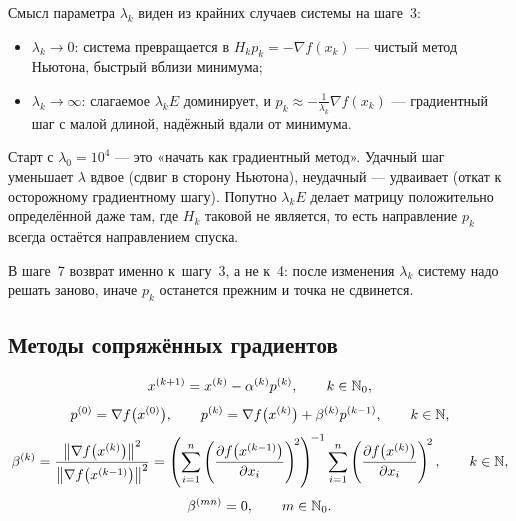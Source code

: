 \begin{idea}
Смысл параметра $\lambda_k$ виден из крайних случаев системы на шаге~3:
\begin{itemize}[nosep,left=0pt]
  \item $\lambda_k \to 0$: система превращается в $H_k p_k = -\nabla f(x_k)$ —
        чистый метод Ньютона, быстрый вблизи минимума;
  \item $\lambda_k \to \infty$: слагаемое $\lambda_k E$ доминирует, и
        $p_k \approx -\frac{1}{\lambda_k}\nabla f(x_k)$ — градиентный шаг с
        малой длиной, надёжный вдали от минимума.
\end{itemize}
Старт с $\lambda_0 = 10^4$ — это «начать как градиентный метод». Удачный шаг
уменьшает $\lambda$ вдвое (сдвиг в сторону Ньютона), неудачный — удваивает
(откат к осторожному градиентному шагу). Попутно $\lambda_k E$ делает матрицу
положительно определённой даже там, где $H_k$ таковой не является, то есть
направление $p_k$ всегда остаётся направлением спуска.

В шаге~7 возврат именно к~шагу~3, а не к~4: после изменения $\lambda_k$ систему
надо решать заново, иначе $p_k$ останется прежним и точка не сдвинется.
\end{idea}

\subsection{Методы сопряжённых градиентов}
\label{subsec:conjugate-gradients}

\[
  x^{(k+1)} = x^{(k)} - \alpha^{(k)} p^{(k)} , \qquad k \in \mathbb{N}_0 ,
\]
\[
  p^{(0)} = \nabla f\big(x^{(0)}\big) ,
  \qquad
  p^{(k)} = \nabla f\big(x^{(k)}\big) + \beta^{(k)} p^{(k-1)} ,
  \qquad k \in \mathbb{N} ,
\]
\[
  \beta^{(k)}
  = \frac{\left\lVert \nabla f\big(x^{(k)}\big) \right\rVert^2}
         {\left\lVert \nabla f\big(x^{(k-1)}\big) \right\rVert^2}
  = \left( \sum_{i=1}^{n}
      \left(\frac{\partial f\big(x^{(k-1)}\big)}{\partial x_i}\right)^{\!2}
    \right)^{\!-1}
    \sum_{i=1}^{n}
      \left(\frac{\partial f\big(x^{(k)}\big)}{\partial x_i}\right)^{\!2} ,
  \qquad k \in \mathbb{N} ,
\]
\[
  \beta^{(mn)} = 0 , \qquad m \in \mathbb{N}_0 .
\]

